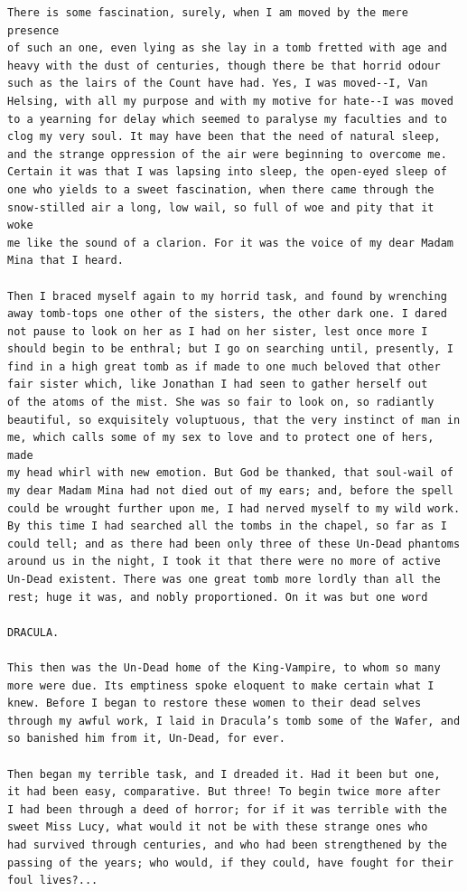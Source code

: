 \documentclass{article}
\begin{document}
\begin{verbatim}
There is some fascination, surely, when I am moved by the mere presence
of such an one, even lying as she lay in a tomb fretted with age and
heavy with the dust of centuries, though there be that horrid odour
such as the lairs of the Count have had. Yes, I was moved--I, Van
Helsing, with all my purpose and with my motive for hate--I was moved
to a yearning for delay which seemed to paralyse my faculties and to
clog my very soul. It may have been that the need of natural sleep,
and the strange oppression of the air were beginning to overcome me.
Certain it was that I was lapsing into sleep, the open-eyed sleep of
one who yields to a sweet fascination, when there came through the
snow-stilled air a long, low wail, so full of woe and pity that it woke
me like the sound of a clarion. For it was the voice of my dear Madam
Mina that I heard.

Then I braced myself again to my horrid task, and found by wrenching
away tomb-tops one other of the sisters, the other dark one. I dared
not pause to look on her as I had on her sister, lest once more I
should begin to be enthral; but I go on searching until, presently, I
find in a high great tomb as if made to one much beloved that other
fair sister which, like Jonathan I had seen to gather herself out
of the atoms of the mist. She was so fair to look on, so radiantly
beautiful, so exquisitely voluptuous, that the very instinct of man in
me, which calls some of my sex to love and to protect one of hers, made
my head whirl with new emotion. But God be thanked, that soul-wail of
my dear Madam Mina had not died out of my ears; and, before the spell
could be wrought further upon me, I had nerved myself to my wild work.
By this time I had searched all the tombs in the chapel, so far as I
could tell; and as there had been only three of these Un-Dead phantoms
around us in the night, I took it that there were no more of active
Un-Dead existent. There was one great tomb more lordly than all the
rest; huge it was, and nobly proportioned. On it was but one word

DRACULA.

This then was the Un-Dead home of the King-Vampire, to whom so many
more were due. Its emptiness spoke eloquent to make certain what I
knew. Before I began to restore these women to their dead selves
through my awful work, I laid in Dracula’s tomb some of the Wafer, and
so banished him from it, Un-Dead, for ever.

Then began my terrible task, and I dreaded it. Had it been but one,
it had been easy, comparative. But three! To begin twice more after
I had been through a deed of horror; for if it was terrible with the
sweet Miss Lucy, what would it not be with these strange ones who
had survived through centuries, and who had been strengthened by the
passing of the years; who would, if they could, have fought for their
foul lives?...


\end{verbatim}
\end{document}

